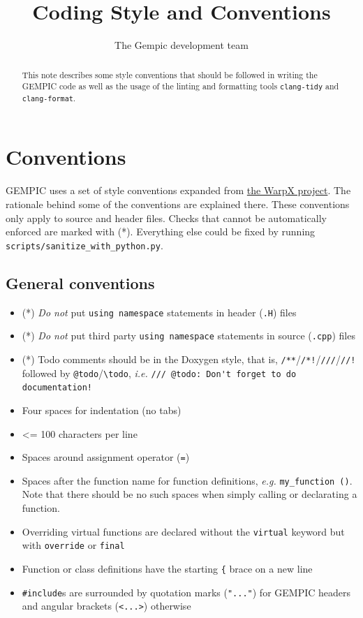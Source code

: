 \documentclass[11pt]{article}
\title{Coding Style and Conventions}
\author[1]{The Gempic development team}
\affil[1]{Max-Planck-Institut f\"ur Plasmaphysik, Garching, Germany}
\begin{document}
\maketitle

\begin{abstract}
This note describes some style conventions that should be followed in writing the GEMPIC code as well as the usage of the linting and formatting tools \verb|clang-tidy| and \verb|clang-format|.
\end{abstract}

\tableofcontents

\section{Conventions}
GEMPIC uses a set of style conventions expanded from \href{https://warpx.readthedocs.io/en/latest/developers/contributing.html#style-and-conventions}{the WarpX project}. The rationale behind some of the conventions are explained there.
These conventions only apply to source and header files. Checks that cannot be automatically enforced are marked with (*). Everything else could be fixed by running \verb|scripts/sanitize_with_python.py|.

\subsection{General conventions}
\begin{itemize}
    \item (*) \emph{Do not} put \lstinline{using namespace} statements in header (\verb|.H|) files
    \item (*) \emph{Do not} put third party \lstinline{using namespace} statements in source (\verb|.cpp|) files
    \item (*) Todo comments should be in the Doxygen style, that is, \lstinline{/**}/\lstinline{/*!}/\lstinline{///}/\lstinline{//!} followed by \lstinline{@todo}/\lstinline{\todo}, \emph{i.e.} \lstinline{/// @todo: Don't forget to do documentation!}
    \item Four spaces for indentation (no tabs)
    \item <= 100 characters per line
    \item Spaces around assignment operator (\lstinline{=})
    \item Spaces after the function name for function definitions, \emph{e.g.} \lstinline{my_function ()}. Note that there should be no such spaces when simply calling or declarating a function.
    \item Overriding virtual functions are declared without the \lstinline{virtual} keyword but with \lstinline{override} or \lstinline{final}
    \item Function or class definitions have the starting \verb|{| brace on a new line
    \item \lstinline{#include}s are surrounded by quotation marks (\verb|"..."|) for GEMPIC headers and angular brackets (\verb|<...>|) otherwise
\end{itemize}
\end{document}
